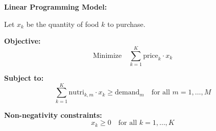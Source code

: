 \documentclass{article}
\begin{document}
\textbf{Linear Programming Model:}

Let \( x_k \) be the quantity of food \( k \) to purchase.

\textbf{Objective:}
\[
\text{Minimize} \quad \sum_{k=1}^{K} \text{price}_k \cdot x_k
\]

\textbf{Subject to:}
\[
\sum_{k=1}^{K} \text{nutri}_{k, m} \cdot x_k \geq \text{demand}_m \quad \text{for all } m = 1, \ldots, M
\]

\textbf{Non-negativity constraints:}
\[
x_k \geq 0 \quad \text{for all } k = 1, \ldots, K
\]
\end{document}
